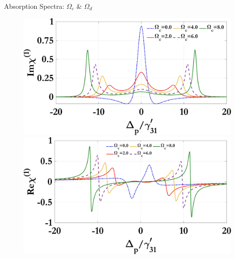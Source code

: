 \documentclass{beamer}
\begin{document}
\begin{frame}{Absorption Spectra: $\Omega_c$ \& $\Omega_d$}
  \vspace{-60pt}
  \begin{figure}[h]
    \centering
    \begin{minipage}{0.46\textwidth}
      \centering
      \includegraphics[width=\linewidth]{Assets/Img_chi1_Omega_c.jpeg}
      \subcaption{}
    \end{minipage}
    \hfill
    \begin{minipage}{0.46\textwidth}
      \centering
      \includegraphics[width=\linewidth]{Assets/Real_chi1_Omega_c.jpeg}
      \subcaption{}
    \end{minipage}\label{fig:chi1_c}
   \end{figure}
\end{frame}
\end{document}
